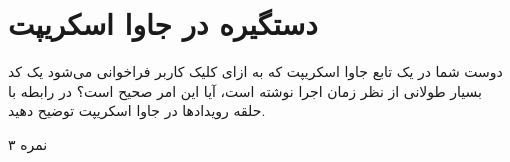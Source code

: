\documentclass[../main.tex]{subfiles}
\begin{document}
\section{دستگیره در جاوا اسکریپت}

دوست شما در یک تابع جاوا اسکریپت که به ازای کلیک کاربر فراخوانی می‌شود یک کد بسیار طولانی از نظر زمان اجرا نوشته است، آیا این امر صحیح است؟ در رابطه با حلقه رویدادها در جاوا اسکریپت توضیح دهید.

۳ نمره
\end{document}
